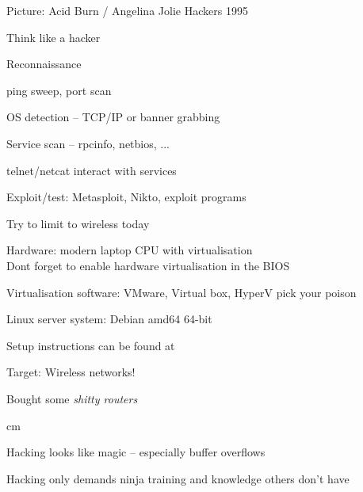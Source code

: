 \documentclass[Screen16to9,17pt]{foils}
\begin{document}
Picture: Acid Burn / Angelina Jolie Hackers 1995



\begin{list1}
\item Think like a hacker
\item Reconnaissance
\begin{list2}
\item ping sweep, port scan
\item OS detection -- TCP/IP or banner grabbing
\item Service scan -- rpcinfo, netbios, ...
\item telnet/netcat interact with services
\end{list2}
\item Exploit/test: Metasploit, Nikto, exploit programs
\end{list1}

Try to limit to wireless today



\begin{list2}
\item Hardware: modern laptop CPU with virtualisation\\
Dont forget to enable hardware virtualisation in the BIOS
\item Virtualisation software: VMware, Virtual box, HyperV pick your poison
\item Linux server system: Debian amd64 64-bit 
\item Setup instructions can be found at 
\item Target: Wireless networks!
\item Bought some \emph{shitty routers}
\end{list2}





 cm

\centerline{Hacking looks like magic -- especially buffer overflows}




\centerline{Hacking only demands ninja training and knowledge others don't have}
\end{document}
